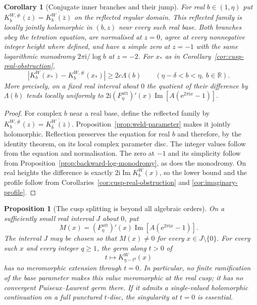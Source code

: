 \documentclass[11pt,a4paper]{article}
\newtheorem{proposition}[theorem]{Proposition}
\newtheorem{corollary}[theorem]{Corollary}
\theoremstyle{definition}
\newcommand{\Kk}{K}
\newcommand{\eee}{\mathrm{e}}
\newcommand{\ii}{\mathrm{i}}
\begin{document}
\begin{corollary}[Conjugate inner branches and their jump]
\label{cor:conjugate-sewn-jump}
For real $b\in(1,\eta)$ put
$\Kk_b^{W,\#}(z)=\overline{\Kk_b^W(\bar z)}$ on the reflected regular
domain.  This reflected family is locally jointly holomorphic in
$(b,z)$ near every such real base.  Both branches obey the tetration
equation, are normalised at $z=0$, agree at every nonnegative integer
height where defined, and have a simple zero at $z=-1$ with the same
logarithmic monodromy $2\pi\ii/\log b$ at $z=-2$.
For $x_*$ as in Corollary~\ref{cor:cusp-real-obstruction},
\[
 |\Kk_b^W(x_*)-\Kk_b^{W,\#}(x_*)|\ge2c\Lambda(b)
 \qquad(\eta-\delta<b<\eta,\ b\in\mathbb R).
\]
More precisely, on a fixed real interval about $0$ the quotient of
their difference by $\Lambda(b)$ tends locally uniformly to
$2\ii(F_\eta^{\mathrm{att}})'(x)
\operatorname{Im}[A(\eee^{2\pi\ii x}-1)]$.
\end{corollary}

\begin{proof}
For complex $b$ near a real base, define the reflected family by
$\Kk_b^{W,\#}(z)=\overline{\Kk_{\bar b}^W(\bar z)}$.
Proposition~\ref{prop:weld-parameter} makes it jointly holomorphic.
Reflection preserves the equation for real $b$ and therefore, by the
identity theorem, on its local complex parameter disc.  The integer
values follow from the equation and normalisation.  The zero at $-1$
and its simplicity follow from Proposition~\ref{prop:backward-log-monodromy},
as does the monodromy.  On real heights the difference is exactly
$2\ii\operatorname{Im}\Kk_b^W(x)$, so the lower bound and the profile
follow from Corollaries~\ref{cor:cusp-real-obstruction} and
\ref{cor:imaginary-profile}.
\end{proof}

\begin{proposition}[The cusp splitting is beyond all algebraic orders]
\label{prop:cusp-no-puiseux}
On a sufficiently small real interval $J$ about $0$, put
\[
 M(x)=(F_\eta^{\mathrm{att}})'(x)
       \operatorname{Im}[A(\eee^{2\pi\ii x}-1)].
\]
The interval $J$ may be chosen so that $M(x)\ne0$ for every
$x\in J\setminus\{0\}$.  For every such $x$
and every integer $q\ge1$, the germ along $t>0$ of
\[
 t\longmapsto\Kk^W_{\eta-t^q}(x)
\]
has no meromorphic extension through $t=0$.  In particular, no finite
ramification of the base parameter makes this value meromorphic at
the real cusp; it has no convergent Puiseux--Laurent germ there.
If it admits a single-valued holomorphic continuation on a full
punctured $t$-disc, the singularity at $t=0$ is essential.
\end{proposition}
\end{document}
